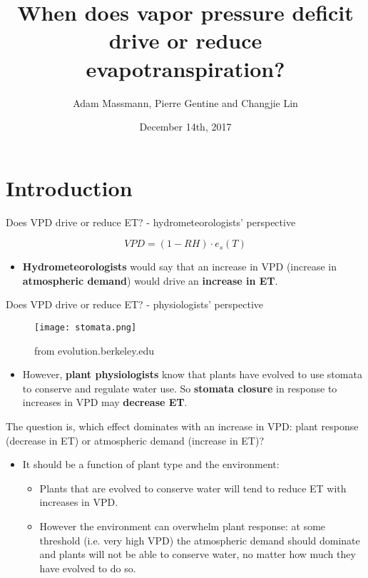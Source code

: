 \documentclass{beamer}
\title[Your Short Title]{When does vapor pressure deficit drive or reduce evapotranspiration?}
\author{Adam Massmann,  Pierre Gentine and Changjie Lin}
\institute{AGU Fall Meeting (Rough Draft)}
\date{December 14th, 2017}
\begin{document}
\begin{frame}
  \titlepage
\end{frame}


\section{Introduction}
\begin{frame}{Does VPD drive or reduce ET? - hydrometeorologists' perspective}
  \begin{Huge}
  \[VPD = (1-RH)\cdot e_s (T)\]
\end{Huge}
  \begin{itemize}
  \item \textbf{Hydrometeorologists} would say that an increase in VPD (increase in \textbf{atmospheric demand}) would drive an \textbf{increase in ET}.
  \end{itemize}
\end{frame}

\begin{frame}{Does VPD drive or reduce ET? - physiologists' perspective}
  \begin{figure}
  \texttt{[image: stomata.png]}%
  \caption{from evolution.berkeley.edu}
\end{figure}
  \begin{itemize}
  \item However, \textbf{plant physiologists} know that plants have evolved to use stomata to conserve and regulate water use. So \textbf{stomata closure} in response to increases in VPD may \textbf{decrease ET}.
  \end{itemize}
\end{frame}


\begin{frame}{The question is, which effect dominates with an increase in VPD: plant response (decrease in ET) or atmospheric demand (increase in ET)?}
  \begin{itemize}
  \item It should be a function of plant type and the environment:
    \begin{itemize}
    \item Plants that are evolved to conserve water will tend to reduce ET with increases in VPD.
    \item However the environment can overwhelm plant response: at some threshold (i.e. very high VPD) the atmospheric demand should dominate and plants will not be able to conserve water, no matter how much they have evolved to do so.
    \end{itemize}
  \end{itemize}
\end{frame}
\end{document}
